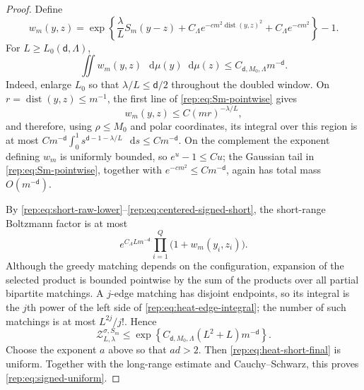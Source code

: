 \documentclass[11pt,reqno]{amsart}
\numberwithin{equation}{section}
\theoremstyle{plain}
\theoremstyle{definition}
\renewcommand{\d}{\mathsf d}
\newcommand{\dd}{\mathop{}\!\mathrm d}
\begin{document}
\begin{proof}
Define
\begin{equation}\label{rep:eq:heat-edge-weight}
 w_m(y,z)=
 \exp\left\{\frac\lambda L S_m(y-z)
 +C_\Lambda e^{-cm^2\operatorname{dist}(y,z)^2}+C_\Lambda e^{-cm^2}\right\}-1.
\end{equation}
For $L\ge L_0(\d,\Lambda)$,
\begin{equation}\label{rep:eq:heat-edge-integral}
 \iint w_m(y,z)\,\dd\mu(y)\dd\mu(z)
 \le C_{\d,M_0,\Lambda}m^{-\d}.
\end{equation}
Indeed, enlarge $L_0$ so that $\lambda/L\le \d/2$ throughout the doubled window.  On $r=\operatorname{dist}(y,z)\le m^{-1}$, the first line of \eqref{rep:eq:Sm-pointwise} gives
\begin{equation}
 w_m(y,z)\le C(mr)^{-\lambda/L},
\end{equation}
and therefore, using $\rho\le M_0$ and polar coordinates, its integral over this region is at most
$Cm^{-\d}\int_0^1s^{\d-1-\lambda/L}\,\dd s\le Cm^{-\d}$.  On the complement the exponent defining $w_m$ is uniformly bounded, so $e^u-1\le C u$; the Gaussian tail in \eqref{rep:eq:Sm-pointwise}, together with $e^{-cm^2}\le Cm^{-\d}$, again has total mass $O(m^{-\d})$.

By \eqref{rep:eq:short-raw-lower}--\eqref{rep:eq:centered-signed-short}, the short-range Boltzmann factor is at most
\begin{equation}\label{rep:eq:selected-matching-product}
 e^{C_\Lambda Lm^{-\d}}
 \prod_{i=1}^Q\bigl(1+w_m(y_i,z_i)\bigr).
\end{equation}
Although the greedy matching depends on the configuration, expansion of the selected product is bounded pointwise by the sum of the products over all partial bipartite matchings.  A $j$-edge matching has disjoint endpoints, so its integral is the $j$th power of the left side of \eqref{rep:eq:heat-edge-integral}; the number of such matchings is at most $L^{2j}/j!$.  Hence
\begin{equation}\label{rep:eq:heat-short-final}
 \mathcal Z_{L,\lambda}^{\sigma,S_m}
 \le\exp\left\{C_{\d,M_0,\Lambda}(L^2+L)m^{-\d}\right\}.
\end{equation}
Choose the exponent $a$ above so that $ad>2$.  Then \eqref{rep:eq:heat-short-final} is uniform.  Together with the long-range estimate and Cauchy--Schwarz, this proves \eqref{rep:eq:signed-uniform}.


\end{proof}
\end{document}
